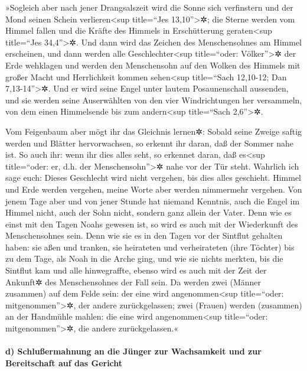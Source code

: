  »Sogleich aber nach jener Drangsalszeit wird die Sonne
sich verfinstern und der Mond seinen Schein verlieren\textless sup
title=``Jes 13,10''\textgreater✲; die Sterne werden vom Himmel fallen
und die Kräfte des Himmels in Erschütterung geraten\textless sup
title=``Jes 34,4''\textgreater✲.  Und dann wird das
Zeichen des Menschensohnes am Himmel erscheinen, und dann werden alle
Geschlechter\textless sup title=``oder: Völker''\textgreater✲ der Erde
wehklagen und werden den Menschensohn auf den Wolken des Himmels mit
großer Macht und Herrlichkeit kommen sehen\textless sup title=``Sach
12,10-12; Dan 7,13-14''\textgreater✲.  Und er wird seine
Engel unter lautem Posaunenschall aussenden, und sie werden seine
Auserwählten von den vier Windrichtungen her versammeln, von dem einen
Himmelsende bis zum andern\textless sup title=``Sach 2,6''\textgreater✲.

 Vom Feigenbaum aber mögt ihr das Gleichnis lernen✲:
Sobald seine Zweige saftig werden und Blätter hervorwachsen, so erkennt
ihr daran, daß der Sommer nahe ist.  So auch ihr: wenn
ihr dies alles seht, so erkennet daran, daß es\textless sup
title=``oder: er, d.h. der Menschensohn''\textgreater✲ nahe vor der Tür
steht.  Wahrlich ich sage euch: Dieses Geschlecht wird
nicht vergehen, bis dies alles geschieht.  Himmel und
Erde werden vergehen, meine Worte aber werden nimmermehr vergehen.
 Von jenem Tage aber und von jener Stunde hat niemand
Kenntnis, auch die Engel im Himmel nicht, auch der Sohn nicht, sondern
ganz allein der Vater.  Denn wie es einst mit den Tagen
Noahs gewesen ist, so wird es auch mit der Wiederkunft des
Menschensohnes sein.  Denn wie sie es in den Tagen vor
der Sintflut gehalten haben: sie aßen und tranken, sie heirateten und
verheirateten (ihre Töchter) bis zu dem Tage, als Noah in die Arche
ging,  und wie sie nichts merkten, bis die Sintflut kam
und alle hinwegraffte, ebenso wird es auch mit der Zeit der Ankunft✲ des
Menschensohnes der Fall sein.  Da werden zwei (Männer
zusammen) auf dem Felde sein: der eine wird angenommen\textless sup
title=``oder: mitgenommen''\textgreater✲, der andere zurückgelassen;
 zwei (Frauen) werden (zusammen) an der Handmühle mahlen:
die eine wird angenommen\textless sup title=``oder:
mitgenommen''\textgreater✲, die andere zurückgelassen.«

\hypertarget{d-schluuxdfermahnung-an-die-juxfcnger-zur-wachsamkeit-und-zur-bereitschaft-auf-das-gericht}{%
\paragraph{d) Schlußermahnung an die Jünger zur Wachsamkeit und zur
Bereitschaft auf das
Gericht}\label{d-schluuxdfermahnung-an-die-juxfcnger-zur-wachsamkeit-und-zur-bereitschaft-auf-das-gericht}}

